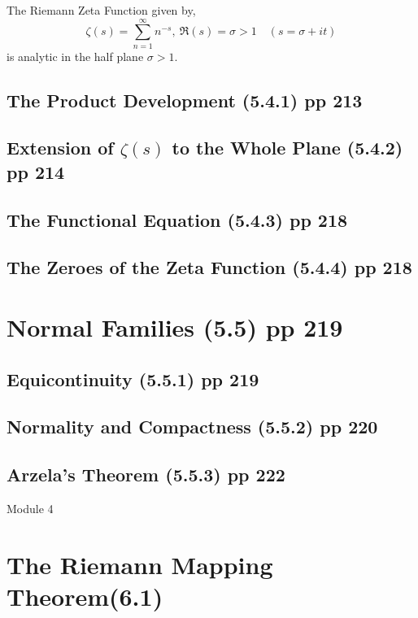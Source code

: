 \begin{definition}
	The Riemann Zeta Function given by,
\begin{equation}
	\zeta(s) = \sum_{n=1}^\infty n^{-s},\ \Re(s) = \sigma > 1 \quad (s = \sigma + it)
\end{equation}
	is analytic in the half plane $\sigma > 1$.
\end{definition}

\subsection{The Product Development (5.4.1) pp 213}
\subsection{Extension of $\zeta(s)$ to the Whole Plane (5.4.2) pp 214}
\subsection{The Functional Equation (5.4.3) pp 218}
\subsection{The Zeroes of the Zeta Function (5.4.4) pp 218}

\section{Normal Families (5.5) pp 219}
\subsection{Equicontinuity (5.5.1) pp 219}
\subsection{Normality and Compactness (5.5.2) pp 220}
\subsection{Arzela's Theorem (5.5.3) pp 222}

\pagebreak
{\Large Module 4}
\section{The Riemann Mapping Theorem(6.1)}
